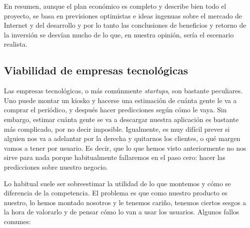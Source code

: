 \documentclass[nochap,palatino,shortheader]{apuntes}
\begin{document}
En resumen, aunque el plan económico es completo y describe bien todo el proyecto, se basa en previsiones optimistas e ideas ingenuas sobre el mercado de Internet y del desarrollo y por lo tanto las conclusiones de beneficios y retorno de la inversión se desvían mucho de lo que, en nuestra opinión, sería el escenario realista.

\subsection{Viabilidad de empresas tecnológicas}

Las empresas tecnológicas, o más comúnmente \textit{startups}, son bastante peculiares. Uno puede montar un kiosko y hacerse una estimación de cuánta gente le va a comprar el periódico, y después hacer predicciones según cómo le vaya. Sin embargo, estimar cuánta gente se va a descargar nuestra aplicación es bastante más complicado, por no decir imposible. Igualmente, es muy difícil prever si alguien nos va a adelantar por la derecha y quitarnos los clientes, o qué margen vamos a tener por usuario. Es decir, que lo que hemos visto anteriormente no nos sirve para nada porque habitualmente fallaremos en el paso cero: hacer las predicciones sobre nuestro negocio.

Lo habitual suele ser sobreestimar la utilidad de lo que montemos y cómo se diferencia de la competencia. El problema es que como nuestro producto es nuestro, lo hemos montado nosotros y le tenemos cariño, tenemos ciertos sesgos a la hora de valorarlo y de pensar cómo lo van a usar los usuarios. Algunos fallos comunes:
\end{document}
